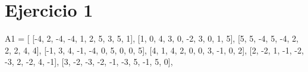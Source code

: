 \documentclass[
  letterpaper,
  DIV=11,
  numbers=noendperiod]{scrartcl}
\newenvironment{Shaded}{\begin{snugshade}}{\end{snugshade}}
\newcommand{\DecValTok}[1]{\textcolor[rgb]{0.68,0.00,0.00}{#1}}
\newcommand{\NormalTok}[1]{\textcolor[rgb]{0.00,0.23,0.31}{#1}}
\newcommand{\OperatorTok}[1]{\textcolor[rgb]{0.37,0.37,0.37}{#1}}
\begin{document}
\section{Ejercicio 1}\label{ejercicio-1}

\begin{Shaded}
\begin{Highlighting}[]
\NormalTok{A1 }\OperatorTok{=}\NormalTok{ [}
\NormalTok{    [}\OperatorTok{{-}}\DecValTok{4}\NormalTok{, }\DecValTok{2}\NormalTok{, }\OperatorTok{{-}}\DecValTok{4}\NormalTok{, }\OperatorTok{{-}}\DecValTok{4}\NormalTok{, }\DecValTok{1}\NormalTok{, }\DecValTok{2}\NormalTok{, }\DecValTok{5}\NormalTok{, }\DecValTok{3}\NormalTok{, }\DecValTok{5}\NormalTok{, }\DecValTok{1}\NormalTok{],}
\NormalTok{    [}\DecValTok{1}\NormalTok{, }\DecValTok{0}\NormalTok{, }\DecValTok{4}\NormalTok{, }\DecValTok{3}\NormalTok{, }\DecValTok{0}\NormalTok{, }\OperatorTok{{-}}\DecValTok{2}\NormalTok{, }\DecValTok{3}\NormalTok{, }\DecValTok{0}\NormalTok{, }\DecValTok{1}\NormalTok{, }\DecValTok{5}\NormalTok{],}
\NormalTok{    [}\DecValTok{5}\NormalTok{, }\DecValTok{5}\NormalTok{, }\OperatorTok{{-}}\DecValTok{4}\NormalTok{, }\DecValTok{5}\NormalTok{, }\OperatorTok{{-}}\DecValTok{4}\NormalTok{, }\DecValTok{2}\NormalTok{, }\DecValTok{2}\NormalTok{, }\DecValTok{2}\NormalTok{, }\DecValTok{4}\NormalTok{, }\DecValTok{4}\NormalTok{],}
\NormalTok{    [}\OperatorTok{{-}}\DecValTok{1}\NormalTok{, }\DecValTok{3}\NormalTok{, }\DecValTok{4}\NormalTok{, }\OperatorTok{{-}}\DecValTok{1}\NormalTok{, }\OperatorTok{{-}}\DecValTok{4}\NormalTok{, }\DecValTok{0}\NormalTok{, }\DecValTok{5}\NormalTok{, }\DecValTok{0}\NormalTok{, }\DecValTok{0}\NormalTok{, }\DecValTok{5}\NormalTok{],}
\NormalTok{    [}\DecValTok{4}\NormalTok{, }\DecValTok{1}\NormalTok{, }\DecValTok{4}\NormalTok{, }\DecValTok{2}\NormalTok{, }\DecValTok{0}\NormalTok{, }\DecValTok{0}\NormalTok{, }\DecValTok{3}\NormalTok{, }\OperatorTok{{-}}\DecValTok{1}\NormalTok{, }\DecValTok{0}\NormalTok{, }\DecValTok{2}\NormalTok{],}
\NormalTok{    [}\DecValTok{2}\NormalTok{, }\OperatorTok{{-}}\DecValTok{2}\NormalTok{, }\DecValTok{1}\NormalTok{, }\OperatorTok{{-}}\DecValTok{1}\NormalTok{, }\OperatorTok{{-}}\DecValTok{2}\NormalTok{, }\OperatorTok{{-}}\DecValTok{3}\NormalTok{, }\DecValTok{2}\NormalTok{, }\OperatorTok{{-}}\DecValTok{2}\NormalTok{, }\DecValTok{4}\NormalTok{, }\OperatorTok{{-}}\DecValTok{1}\NormalTok{],}
\NormalTok{    [}\DecValTok{3}\NormalTok{, }\OperatorTok{{-}}\DecValTok{2}\NormalTok{, }\OperatorTok{{-}}\DecValTok{3}\NormalTok{, }\OperatorTok{{-}}\DecValTok{2}\NormalTok{, }\OperatorTok{{-}}\DecValTok{1}\NormalTok{, }\OperatorTok{{-}}\DecValTok{3}\NormalTok{, }\DecValTok{5}\NormalTok{, }\OperatorTok{{-}}\DecValTok{1}\NormalTok{, }\DecValTok{5}\NormalTok{, }\DecValTok{0}\NormalTok{],}

\end{Highlighting}
\end{Shaded}
\end{document}
